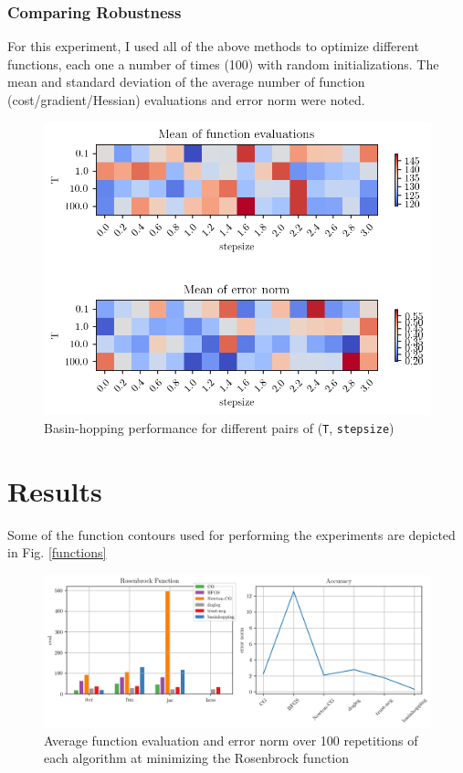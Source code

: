\documentclass[conference]{IEEEtran}
\begin{document}
\subsubsection{Comparing Robustness}

For this experiment, I used all of the above methods to optimize different functions, each one a number of times (100) with random initializations. The mean and standard deviation of the average number of function (cost/gradient/Hessian) evaluations and error norm were noted.

\begin{figure}[htbp]
\centerline{\includegraphics[width=.5\textwidth]{T_stepsize.png}}
\caption{Basin-hopping performance for different pairs of (\texttt{T}, \texttt{stepsize})}
\label{T_stepsize}
\end{figure}

\section{Results}

Some of the function contours used for performing the experiments are depicted in Fig. \ref{functions}

\begin{figure}[htbp]
\centerline{\includegraphics[width=\textwidth]{robust.png}}
\caption{Average function evaluation and error norm over 100 repetitions of each algorithm at minimizing the Rosenbrock function}
\label{robust}
\end{figure}
\end{document}
